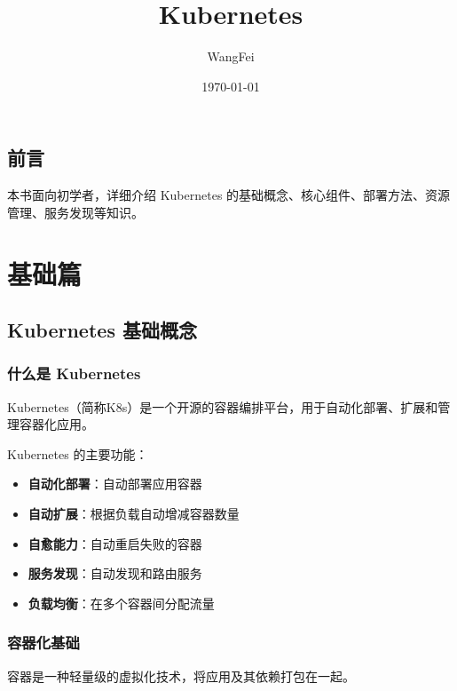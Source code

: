 \documentclass[12pt,UTF8]{ctexbook}
\title{\heiti\zihao{0} Kubernetes}
\author{WangFei}
\date{\today}
\begin{document}
\maketitle
\tableofcontents

\frontmatter
\chapter{前言}

本书面向初学者，详细介绍 Kubernetes 的基础概念、核心组件、部署方法、资源管理、服务发现等知识。

\mainmatter

\part{基础篇}

\chapter{Kubernetes 基础概念}
\label{chap:k8s_basics}

\section{什么是 Kubernetes}
\label{sec:what_is_k8s}

Kubernetes（简称K8s）是一个开源的容器编排平台，用于自动化部署、扩展和管理容器化应用。

Kubernetes 的主要功能：
\begin{itemize}
    \item \textbf{自动化部署}：自动部署应用容器
    \item \textbf{自动扩展}：根据负载自动增减容器数量
    \item \textbf{自愈能力}：自动重启失败的容器
    \item \textbf{服务发现}：自动发现和路由服务
    \item \textbf{负载均衡}：在多个容器间分配流量
\end{itemize}

\section{容器化基础}
\label{sec:containerization}

容器是一种轻量级的虚拟化技术，将应用及其依赖打包在一起。
\end{document}
